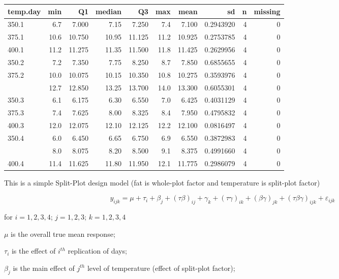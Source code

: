 \documentclass[12pt,]{article}
\begin{document}
\begin{table}[H]
\centering\begingroup\fontsize{8}{10}\selectfont

\begin{tabular}{lrrrrr>{\columncolor[HTML]{EAFAF1}}rrrr}
\toprule
temp.day & min & Q1 & median & Q3 & max & mean & sd & n & missing\\
\midrule
350.1 & 6.7 & 7.000 & 7.15 & 7.250 & 7.4 & 7.100 & 0.2943920 & 4 & 0\\
375.1 & 10.6 & 10.750 & 10.95 & 11.125 & 11.2 & 10.925 & 0.2753785 & 4 & 0\\
400.1 & 11.2 & 11.275 & 11.35 & 11.500 & 11.8 & 11.425 & 0.2629956 & 4 & 0\\
350.2 & 7.2 & 7.350 & 7.75 & 8.250 & 8.7 & 7.850 & 0.6855655 & 4 & 0\\
375.2 & 10.0 & 10.075 & 10.15 & 10.350 & 10.8 & 10.275 & 0.3593976 & 4 & 0\\
\addlinespace
400.2 & 12.7 & 12.850 & 13.25 & 13.700 & 14.0 & 13.300 & 0.6055301 & 4 & 0\\
350.3 & 6.1 & 6.175 & 6.30 & 6.550 & 7.0 & 6.425 & 0.4031129 & 4 & 0\\
375.3 & 7.4 & 7.625 & 8.00 & 8.325 & 8.4 & 7.950 & 0.4795832 & 4 & 0\\
400.3 & 12.0 & 12.075 & 12.10 & 12.125 & 12.2 & 12.100 & 0.0816497 & 4 & 0\\
350.4 & 6.0 & 6.450 & 6.65 & 6.750 & 6.9 & 6.550 & 0.3872983 & 4 & 0\\
\addlinespace
375.4 & 8.0 & 8.075 & 8.20 & 8.500 & 9.1 & 8.375 & 0.4991660 & 4 & 0\\
400.4 & 11.4 & 11.625 & 11.80 & 11.950 & 12.1 & 11.775 & 0.2986079 & 4 & 0\\
\bottomrule
\end{tabular}
\endgroup{}
\end{table}

This is a simple Split-Plot design model (fat is whole-plot factor and
temperature is split-plot factor)

\[y_{ijk}=\mu+\tau_i+\beta_{j}+(\tau\beta)_{ij}+\gamma_{k}+(\tau\gamma)_{ik}+(\beta\gamma)_{jk}+(\tau\beta\gamma)_{ijk}+\varepsilon_{ijk}\]

for \(i=1,2,3,4\); \(j=1,2,3\); \(k=1,2,3,4\)

\(\mu\) is the overall true mean response;

\(\tau_i\) is the effect of \(i^{th}\) replication of days;

\(\beta_{j}\) is the main effect of \(j^{th}\) level of temperature
(effect of split-plot factor);
\end{document}
